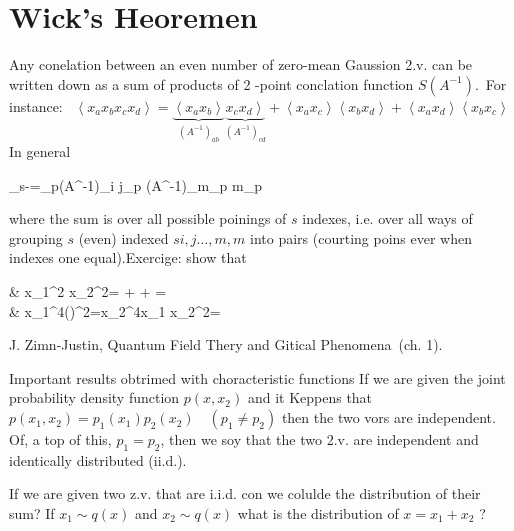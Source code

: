 \section*{Wick's Heoremen}
Any conelation between an even number of zero-mean Gaussion 2.v. can be written down as a sum of products of 2 -point conclation function $S\left(A^{-1}\right)$.\
For instance: \
$\left\langle x_{a} x_{b} x_{c} x_{d}\right\rangle=\underbrace{\left\langle x_{a} x_{b}\right\rangle}_{\left(A^{-1}\right)_{a b}} \underbrace{\left.x_{c} x_{d}\right\rangle}_{\left(A^{-1}\right)_{c d}}+\left\langle x_{a} x_{c}\right\rangle\left\langle x_{b} x_{d}\right\rangle+\left\langle x_{a} x_{d}\right\rangle\left\langle x_{b} x_{c}\right\rangle$
In general
\begin{DispWithArrows}[format=c, displaystyle]
\langle{}_{s-}\rangle=\sum_{p}\left(A^{-1}\right)_{i j_{p}} \cdots\left(A^{-1}\right)_{m_{p} m_{p}}
\end{DispWithArrows}
where the sum is over all possible poinings of $s$ indexes, i.e. over all ways of grouping $s$ (even) indexed $s i, j \ldots, m, m$ into pairs (courting poins ever when indexes one equal).Exercige: show that
\begin{DispWithArrows}[format=rL]
& \left\langle x_{1}^{2} x_{2}^{2}\right\rangle=\frac{3}{8} \cdot \frac{3}{8}+\frac{1}{8} \cdot \frac{1}{8}+\frac{1}{8} \cdot \frac{1}{8}=\frac{11}{64} \\
& \left\langle x_{1}^{4}\right{}\left(\right)^{2}=\left\langle x_{2}^{4}\right\rangle \quad\left\langle x_{1} x_{2}^{2}\right\rangle=
\end{DispWithArrows}
J. Zimn-Justin, Quantum Field Thery and Gitical Phenomena\
(ch. 1).

Important results obtrimed with choracteristic functions If we are given the joint probability density function $p\left(x, x_{2}\right)$ and it Keppens that $p\left(x_{1}, x_{2}\right)=p_{1}\left(x_{1}\right) p_{2}\left(x_{2}\right) \quad\left(p_{1} \neq p_{2}\right)$ then the two vors are independent. Of, a top of this, $p_{1}=p_{2}$, then we soy that the two 2.v. are independent and identically distributed (ii.d.).

If we are given two z.v. that are i.i.d. con we colulde the distribution of their sum?
If $x_{1} \sim q(x)$ and $x_{2} \sim q(x)$ what is the distribution of $x=x_{1}+x_{2}$ ?
